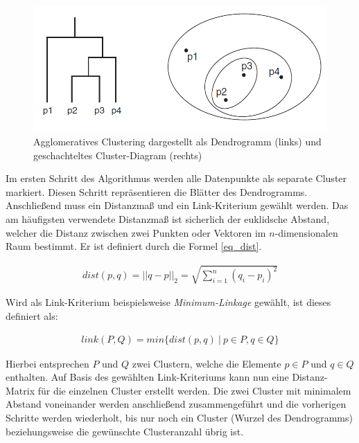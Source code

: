 \begin{figure}[H]
    \centering
    \includegraphics[width=0.7\linewidth]{resources/img/grundlagen/agglo_clustering}
    \caption[Darstellung Funktionsweise Agglomeratives Clustering]{Agglomeratives Clustering dargestellt als Dendrogramm (links) und geschachteltes Cluster-Diagram (rechts)}
    \label{fig:grund_agglo_clustering}
\end{figure}

Im ersten Schritt des Algorithmus werden alle Datenpunkte als separate Cluster markiert. Diesen Schritt
repräsentieren die Blätter des Dendrogramms.
Anschließend muss ein Distanzmaß und ein Link-Kriterium gewählt werden.
Das am häufigsten verwendete Distanzmaß ist sicherlich der euklidsche Abstand, welcher die Distanz zwischen zwei Punkten
oder Vektoren im $n$-dimensionalen Raum bestimmt. Er ist definiert durch die Formel \ref{eq_dist}.

\begin{ceqn}
\begin{align}
\label{eq_dist}
    dist(p,q) = ||q-p||_2 = \sqrt{\sum_{i=1}^n (q_i-p_i)^2}
\end{align}
\end{ceqn}

Wird als Link-Kriterium beispielsweise \textit{Minimum-Linkage} gewählt, ist dieses definiert als:

\begin{ceqn}
\begin{align}
\label{eq_linkage}
    link(P, Q) = min\{ dist(p,q)\ |\ p \in P, q \in Q\}
\end{align}
\end{ceqn}

Hierbei entsprechen $P$ und $Q$ zwei Clustern, welche die Elemente $p \in P$ und $q \in Q$ enthalten.
Auf Basis des gewählten Link-Kriteriums kann nun eine Distanz-Matrix für die einzelnen Cluster
erstellt werden.
Die zwei Cluster mit minimalem Abstand voneinander werden anschließend zusammengeführt und die
vorherigen Schritte werden wiederholt, bis nur noch ein Cluster (Wurzel des Dendrogramms) beziehungsweise
die gewünschte Clusteranzahl übrig ist. \cite[]{GeorgeSeif2018, tan2007introduction}

